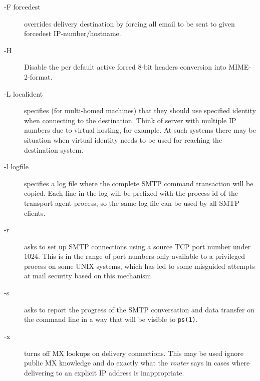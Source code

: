 \begin{description}
\item[-F forcedest] \mbox{}

overrides delivery destination by forcing all
email to be sent to given forcedest IP-number/hostname.



\item[-H] \mbox{}

Disable the per default active forced 8-bit headers
conversion into MIME-2-format.



\item[-L localident] \mbox{}

specifies (for multi-homed machines) that they
should use specified identity when connecting to
the destination. Think of server with multiple IP
numbers due to virtual hosting, for example. At
such systems there may be situation when virtual
identity needs to be used for reaching the destination system.



\item[-l logfile] \mbox{}

specifies a log file where the complete SMTP command 
transaction will be copied. Each line in the
log will be prefixed with the process id of the
transport agent process, so the same log file can
be used by all SMTP clients.



\item[-r] \mbox{}

asks to set up SMTP connections using a source TCP
port number under 1024. This is in the range of
port numbers only available to a privileged process
on some UNIX systems, which has led to some 
misguided attempts at mail security based on this
mechanism.



\item[-s] \mbox{}

asks to report the progress of the SMTP conversation 
and data transfer on the command line in a way
that will be visible to {\tt ps(1)}.



\item[-x] \mbox{}

turns off MX lookups on delivery connections. This
may be used ignore public MX knowledge and do
exactly what the {\em router\/} says in cases where delivering 
to an explicit IP address is inappropriate.




\end{description}
